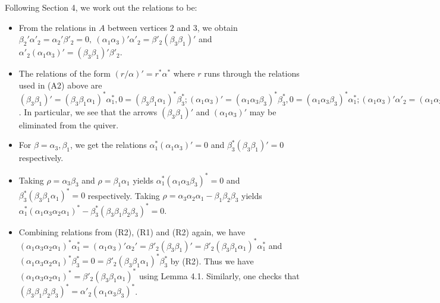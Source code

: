 \documentclass{amsart}
\begin{document}
Following Section 4, we work out the relations to be:
\begin{itemize}
\item[(R1)] From the relations in $A$ between vertices $2$ and $3$, we obtain $\beta_2' \alpha'_2 = \alpha_2' \beta'_2 = 0, \ (\alpha_1 \alpha_3)' \alpha'_2 = \beta'_2 (\beta_3 \beta_1)'$ and $\alpha'_2 (\alpha_1 \alpha_3)' = (\beta_3 \beta_1)' \beta'_2$.

\item[(R2)] The relations of the form $(r/\alpha)' = r^* \alpha^*$ where $r$ runs through the relations used in (A2) above are $(\beta_3 \beta_1)' = (\beta_3 \beta_1 \alpha_1)^* \alpha_1^*, 0 = (\beta_3 \beta_1 \alpha_1)^* \beta_3^*; (\alpha_1 \alpha_3)' = (\alpha_1 \alpha_3 \beta_3)^* \beta_3^*, 0 =  (\alpha_1 \alpha_3 \beta_3)^* \alpha_1^*; (\alpha_1 \alpha_3)' \alpha'_2 = (\alpha_1 \alpha_3 \alpha_2 \alpha_1)^* \alpha_1^*;  0 = (\alpha_1 \alpha_3 \alpha_2 \alpha_1)^* \beta_3^*; (\beta_3 \beta_1)' \beta'_2 = (\beta_3 \beta_1 \beta_2 \beta_3)^*\beta_3^*; 0 = (\beta_3 \beta_1 \beta_2 \beta_3)^* \alpha_1^*$.  In particular, we see that the arrows $(\beta_3 \beta_1)'$ and $(\alpha_1 \alpha_3)'$ may be eliminated from the quiver.

\item[(R3)] For $\beta = \alpha_3, \beta_1$, we get the relations $\alpha_1^*(\alpha_1 \alpha_3)' = 0$ and $\beta_3^* (\beta_3 \beta_1)' = 0$ respectively.

\item[(R4)] Taking $\rho = \alpha_3 \beta_3$ and $\rho = \beta_1 \alpha_1$ yields $\alpha_1^* (\alpha_1 \alpha_3 \beta_3)^* = 0$ and $\beta_3^* (\beta_3 \beta_1 \alpha_1)^* = 0$ respectively.  Taking $\rho = \alpha_3 \alpha_2 \alpha_1 - \beta_1 \beta_2 \beta_3$ yields $\alpha_1^* (\alpha_1 \alpha_3 \alpha_2 \alpha_1)^* - \beta_3^*(\beta_3 \beta_1 \beta_2 \beta_3)^* = 0$.

\item[(R5)] Combining relations from (R2), (R1) and (R2) again, we have $(\alpha_1 \alpha_3 \alpha_2 \alpha_1)^*\alpha_1^* = (\alpha_1 \alpha_3)' \alpha_2' = \beta'_2 (\beta_3 \beta_1)' = \beta'_2 (\beta_3 \beta_1 \alpha_1)^* \alpha_1^*$ and $(\alpha_1 \alpha_3 \alpha_2 \alpha_1)^* \beta_3^* = 0 = \beta'_2(\beta_3 \beta_1 \alpha_1)^* \beta_3^*$ by (R2).  Thus we have $(\alpha_1 \alpha_3 \alpha_2 \alpha_1)^* = \beta'_2(\beta_3 \beta_1 \alpha_1)^*$ using Lemma 4.1.  Similarly, one checks that $(\beta_3 \beta_1 \beta_2 \beta_3)^* = \alpha'_2 (\alpha_1 \alpha_3 \beta_3)^*$.

\end{itemize}
\end{document}
